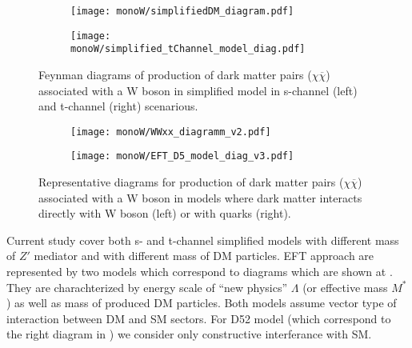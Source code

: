 



\begin{figure}[]

\centering
\begin{subfigure}{.5\textwidth}
  \centering
  \texttt{[image: monoW/simplifiedDM\_diagram.pdf]}
\end{subfigure}%
\begin{subfigure}{.5\textwidth}
  \centering
  \texttt{[image: monoW/simplified\_tChannel\_model\_diag.pdf]}
\end{subfigure}
  \caption{Feynman diagrams of production of dark matter pairs ($\chi\overline{\chi}$) associated with a W boson in simplified model 
	   in s-channel (left) and t-channel (right) scenarious.}
  \label{fig:feynMonoWSimple}
\end{figure}


\begin{figure}[]

\centering
\begin{subfigure}{.5\textwidth}
  \centering
  \texttt{[image: monoW/WWxx\_diagramm\_v2.pdf]}
\end{subfigure}%
\begin{subfigure}{.5\textwidth}
  \centering
  \texttt{[image: monoW/EFT\_D5\_model\_diag\_v3.pdf]}
\end{subfigure}
  \caption{Representative diagrams for production of dark matter pairs ($\chi\overline{\chi}$) associated with a W boson in models where
dark matter interacts directly with W boson (left) or with quarks (right).}
  \label{fig:feynMonoWEFT}
\end{figure}

Current study cover both s- and t-channel simplified models with different mass of $Z'$ mediator and with different mass of DM particles.
EFT approach are represented by two models which correspond to diagrams which are shown at . 
They are charachterized by energy scale of ``new physics'' $\Lambda$ (or effective mass $M^{*}$) as well as mass of produced DM particles.
Both models assume vector type of interaction between DM and SM sectors. For D52 model (which correspond to the right diagram in  ) 
we consider only constructive interferance with SM.

